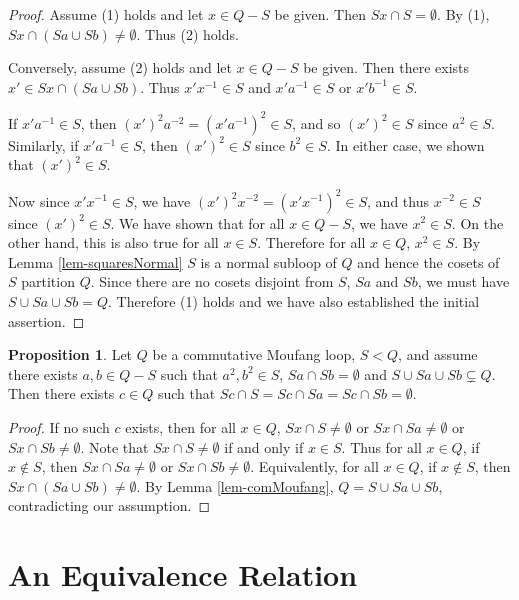 \documentclass[12pt]{report}
\theoremstyle{definition}
\newtheorem{prp}[thm]{Proposition}
\begin{document}
\begin{proof}
  Assume (1) holds and let $x\in Q- S$ be given. Then $Sx\cap S = \emptyset$. By (1),
    $Sx\cap (Sa\cup Sb)\neq \emptyset$. Thus (2) holds.
  
  Conversely, assume (2) holds and let $x\in Q- S$ be given. Then there exists
    $x'\in Sx\cap (Sa\cup Sb)$. Thus $x'x^{-1}\in S$ and $x'a^{-1}\in S$ or $x'b^{-1}\in S$.
  
  If $x'a^{-1}\in S$, then $(x')^2 a^{-2} = (x'a^{-1})^2\in S$, and so $(x')^2\in S$ since
    $a^2\in S$. Similarly, if $x'a^{-1}\in S$, then $(x')^2\in S$ since $b^2\in S$. In either
    case, we shown that $(x')^2\in S$.
  
  Now since $x'x^{-1}\in S$, we have $(x')^2 x^{-2} = (x'x^{-1})^2\in S$, and thus $x^{-2}\in S$
    since $(x')^2\in S$. We have shown that for all $x\in Q - S$, we have $x^2\in S$. On the other
    hand, this is also true for all $x\in S$. Therefore for all $x\in Q$, $x^2\in S$. By Lemma
    \ref{lem-squaresNormal} $S$ is a normal subloop of $Q$ and hence the cosets of $S$ partition $Q$.
    Since there are no cosets disjoint from $S$, $Sa$ and $Sb$, we must have $S\cup Sa\cup Sb = Q$.
    Therefore (1) holds and we have also established the initial assertion.
\end{proof}

\begin{prp}
  Let $Q$ be a commutative Moufang loop, $S < Q$, and assume there exists $a,b\in Q- S$ such that
    $a^2,b^2\in S$, $Sa\cap Sb=\emptyset$ and $S\cup Sa\cup Sb \subsetneq Q$. Then there exists
    $c\in Q$ such that $Sc\cap S = Sc\cap Sa = Sc\cap Sb = \emptyset$.
\end{prp}

\begin{proof}
  If no such $c$ exists, then for all $x\in Q$, $Sx\cap S \neq \emptyset$ or
    $Sx\cap Sa \neq \emptyset$ or $Sx\cap Sb\neq \emptyset$. Note that
    $Sx\cap S\neq\emptyset$ if and only if $x\in S$. Thus for all $x\in Q$, if $x\not\in S$,
    then $Sx\cap Sa\neq\emptyset$ or $Sx\cap Sb\neq\emptyset$. Equivalently, for all $x\in Q$,
    if $x\not\in S$, then $Sx\cap (Sa\cup Sb)\neq \emptyset$. By Lemma \ref{lem-comMoufang},
    $Q = S\cup Sa\cup Sb$, contradicting our assumption.
\end{proof}

\section{An Equivalence Relation}
\end{document}
